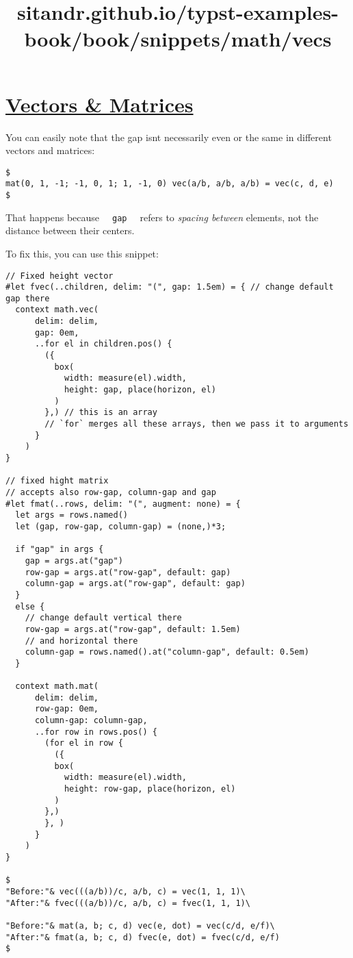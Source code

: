 \title{sitandr.github.io/typst-examples-book/book/snippets/math/vecs}

\section{\texorpdfstring{\hyperref[vectors--matrices]{Vectors \&
Matrices}}{Vectors \& Matrices}}\label{vectors--matrices}

You can easily note that the gap isn\textquotesingle t necessarily even
or the same in different vectors and matrices:

\begin{verbatim}
$
mat(0, 1, -1; -1, 0, 1; 1, -1, 0) vec(a/b, a/b, a/b) = vec(c, d, e)
$
\end{verbatim}

\pandocbounded{}

That happens because \texttt{\ }{\texttt{\ gap\ }}\texttt{\ } refers to
\emph{spacing between} elements, not the distance between their centers.

To fix this, you can use this snippet:

\begin{verbatim}
// Fixed height vector
#let fvec(..children, delim: "(", gap: 1.5em) = { // change default gap there
  context math.vec(
      delim: delim,
      gap: 0em,
      ..for el in children.pos() {
        ({
          box(
            width: measure(el).width,
            height: gap, place(horizon, el)
          )
        },) // this is an array
        // `for` merges all these arrays, then we pass it to arguments
      }
    )
}

// fixed hight matrix
// accepts also row-gap, column-gap and gap
#let fmat(..rows, delim: "(", augment: none) = {
  let args = rows.named()
  let (gap, row-gap, column-gap) = (none,)*3;

  if "gap" in args {
    gap = args.at("gap")
    row-gap = args.at("row-gap", default: gap)
    column-gap = args.at("row-gap", default: gap)
  }
  else {
    // change default vertical there
    row-gap = args.at("row-gap", default: 1.5em) 
    // and horizontal there
    column-gap = rows.named().at("column-gap", default: 0.5em)
  }

  context math.mat(
      delim: delim,
      row-gap: 0em,
      column-gap: column-gap,
      ..for row in rows.pos() {
        (for el in row {
          ({
          box(
            width: measure(el).width,
            height: row-gap, place(horizon, el)
          )
        },)
        }, )
      }
    )
}

$
"Before:"& vec(((a/b))/c, a/b, c) = vec(1, 1, 1)\
"After:"& fvec(((a/b))/c, a/b, c) = fvec(1, 1, 1)\

"Before:"& mat(a, b; c, d) vec(e, dot) = vec(c/d, e/f)\
"After:"& fmat(a, b; c, d) fvec(e, dot) = fvec(c/d, e/f)
$
\end{verbatim}

\pandocbounded{}
